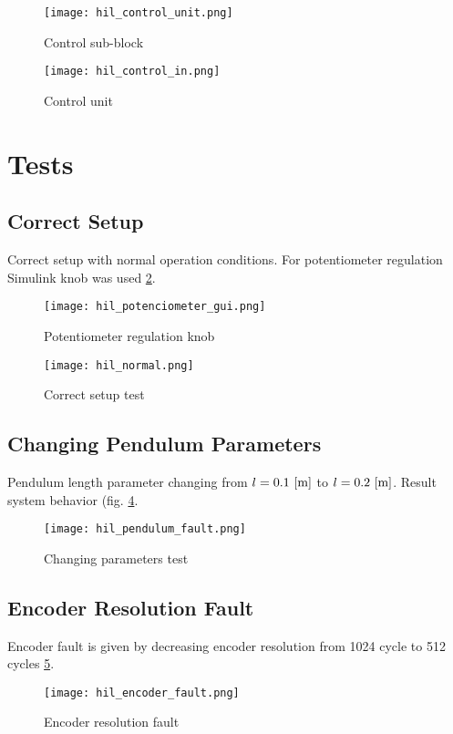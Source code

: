 \begin{figure}[hbt!]
    \centering
    \begin{minipage}{.5\textwidth}
    \centering
    \texttt{[image: hil\_control\_unit.png]}
\caption{Control sub-block}
\label{fig:control_unit1}
\end{minipage}%
\begin{minipage}{.5\textwidth}
    \centering
    \texttt{[image: hil\_control\_in.png]}
    \caption{Control unit}
    \label{fig:control_unit2}
\end{minipage}
\end{figure}

\section{Tests}

\subsection{Correct Setup}
Correct setup with normal operation conditions. For potentiometer
regulation Simulink knob was used \ref{fig:knob}.  

\begin{figure}[h!]
    \centering
    \texttt{[image: hil\_potenciometer\_gui.png]}
    \caption{Potentiometer regulation knob}
    \label{fig:knob}
\end{figure}


\begin{figure}[htb!]
    \centering
    \texttt{[image: hil\_normal.png]}
\caption{Correct setup test}
    \label{fig:correct}
\end{figure}

\subsection{Changing Pendulum Parameters}
Pendulum length parameter changing from $l = 0.1 \rm\  [m]$ to
$l = 0.2 \rm\  [m]$. Result system behavior  (fig. \ref{fig:change}.

\begin{figure}[htb!]
    \centering
    \texttt{[image: hil\_pendulum\_fault.png]}
\caption{Changing parameters test}
    \label{fig:change}
\end{figure}

\subsection{Encoder Resolution Fault}
Encoder fault is given by decreasing encoder resolution from  1024 cycle to 
512 cycles \ref{fig:encoder_fault}.
\begin{figure}[htb!]
    \centering
    \texttt{[image: hil\_encoder\_fault.png]}
\caption{Encoder resolution fault}
    \label{fig:encoder_fault}
\end{figure}

